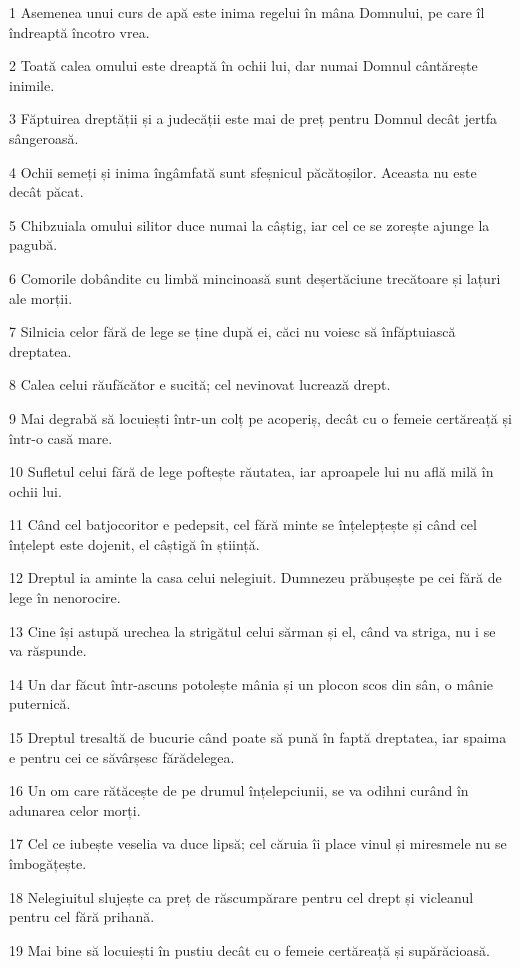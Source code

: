\par 1 Asemenea unui curs de apă este inima regelui în mâna Domnului, pe care îl îndreaptă încotro vrea.
\par 2 Toată calea omului este dreaptă în ochii lui, dar numai Domnul cântărește inimile.
\par 3 Făptuirea dreptății și a judecății este mai de preț pentru Domnul decât jertfa sângeroasă.
\par 4 Ochii semeți și inima îngâmfată sunt sfeșnicul păcătoșilor. Aceasta nu este decât păcat.
\par 5 Chibzuiala omului silitor duce numai la câștig, iar cel ce se zorește ajunge la pagubă.
\par 6 Comorile dobândite cu limbă mincinoasă sunt deșertăciune trecătoare și lațuri ale morții.
\par 7 Silnicia celor fără de lege se ține după ei, căci nu voiesc să înfăptuiască dreptatea.
\par 8 Calea celui răufăcător e sucită; cel nevinovat lucrează drept.
\par 9 Mai degrabă să locuiești într-un colț pe acoperiș, decât cu o femeie certăreață și într-o casă mare.
\par 10 Sufletul celui fără de lege poftește răutatea, iar aproapele lui nu află milă în ochii lui.
\par 11 Când cel batjocoritor e pedepsit, cel fără minte se înțelepțește și când cel înțelept este dojenit, el câștigă în știință.
\par 12 Dreptul ia aminte la casa celui nelegiuit. Dumnezeu prăbușește pe cei fără de lege în nenorocire.
\par 13 Cine își astupă urechea la strigătul celui sărman și el, când va striga, nu i se va răspunde.
\par 14 Un dar făcut într-ascuns potolește mânia și un plocon scos din sân, o mânie puternică.
\par 15 Dreptul tresaltă de bucurie când poate să pună în faptă dreptatea, iar spaima e pentru cei ce săvârșesc fărădelegea.
\par 16 Un om care rătăcește de pe drumul înțelepciunii, se va odihni curând în adunarea celor morți.
\par 17 Cel ce iubește veselia va duce lipsă; cel căruia îi place vinul și miresmele nu se îmbogățește.
\par 18 Nelegiuitul slujește ca preț de răscumpărare pentru cel drept și vicleanul pentru cel fără prihană.
\par 19 Mai bine să locuiești în pustiu decât cu o femeie certăreață și supărăcioasă.
